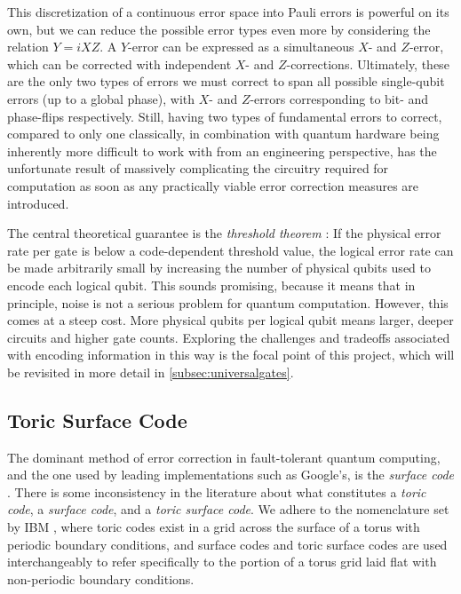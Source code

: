 This discretization of a continuous error space into Pauli errors is powerful on its own, but we can reduce the possible error types even more by considering the relation $Y = i X Z$. A $Y$-error can be expressed as a simultaneous $X$- and $Z$-error, which can be corrected with independent $X$- and $Z$-corrections. Ultimately, these are the only two types of errors we must correct to span all possible single-qubit errors (up to a global phase),  with $X$- and $Z$-errors corresponding to bit- and phase-flips respectively. Still, having two types of fundamental errors to correct, compared to only one classically, in combination with quantum hardware being inherently more difficult to work with from an engineering perspective, has the unfortunate result of massively complicating the circuitry required for computation as soon as any practically viable error correction measures are introduced. 

The central theoretical guarantee is the \emph{threshold theorem} \cite{Nielsen_Chuang_2010}: If the physical error rate per gate is below a code-dependent threshold value, the logical error rate can be made arbitrarily small by increasing the number of physical qubits used to encode each logical qubit. This sounds promising, because it means that in principle, noise is not a serious problem for quantum computation. However, this comes at a steep cost. More physical qubits per logical qubit means larger, deeper circuits and higher gate counts. Exploring the challenges and tradeoffs associated with encoding information in this way is the focal point of this project, which will be revisited in more detail in \cref{subsec:universalgates}.

\subsection{Toric Surface Code}\label{sec:toriccode}
The dominant method of error correction in fault-tolerant quantum computing, and the one used by leading implementations such as Google's, is the \emph{surface code} \cite{GoogleQuantumAI2025}. There is some inconsistency in the literature about what constitutes a \emph{toric code}, a \emph{surface code}, and a \emph{toric surface code}. We adhere to the nomenclature set by IBM \cite{ibm_quantum_other_code_families}, where toric codes exist in a grid across the surface of a torus with periodic boundary conditions, and surface codes and toric surface codes are used interchangeably to refer specifically to the portion of a torus grid laid flat with non-periodic boundary conditions.

